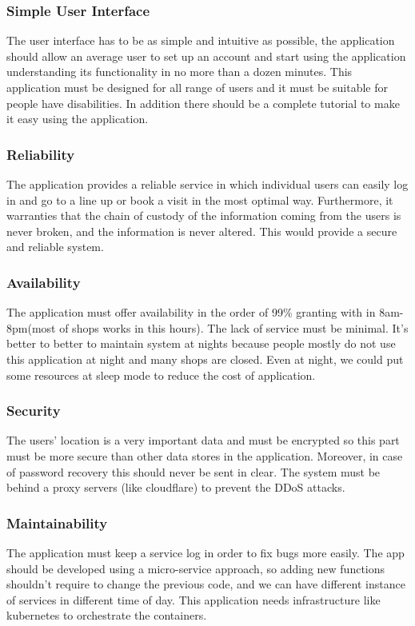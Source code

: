 \subsubsection{Simple User Interface}
The user interface has to be as simple and intuitive as possible, the application should allow an average user to set up an account and start using the application understanding its functionality in no more than a dozen minutes. This application must be designed for all range of users and it must be suitable for people have disabilities. In addition there should be a complete tutorial to make it easy using the application.
\\

\subsubsection{Reliability}
The application provides a reliable service in which individual users can easily log in and go to a line up or book a visit in the most optimal way. Furthermore, it warranties that the chain of custody of the information coming from the users is never broken, and the information is never altered. This would provide a secure and reliable system.

\subsubsection{Availability}
The application must offer availability in the order of 99\% granting with in 8am-8pm(most of shops works in this hours). The lack of service must be minimal. It's better to better to maintain system at nights because people mostly do not use this application at night and many shops are closed. Even at night, we could put some resources at sleep mode to reduce the cost of application.
\\

\subsubsection{Security}
The users' location is a very important data and must be encrypted so this part must be more secure than other data stores in the application. Moreover, in case of password recovery this should never be sent in clear. The system must be behind a proxy servers (like cloudflare) to prevent the DDoS attacks.
\\

\subsubsection{Maintainability}
The application must keep a service log in order to fix bugs more easily. The app should be developed using a micro-service approach, so adding new functions shouldn’t require to change the previous code, and we can have different instance of services in different time of day. This application needs infrastructure like kubernetes to orchestrate the containers.
\\

